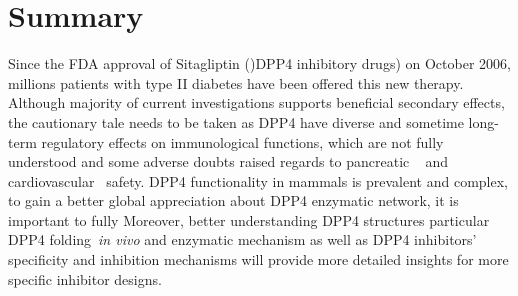 \section{\label{chap:Sum} Summary}
Since the FDA approval of Sitagliptin ()DPP4 inhibitory drugs) on October 2006, millions patients with type II diabetes have been offered this new therapy. Although majority of current investigations supports beneficial secondary effects, the cautionary tale needs to be taken as DPP4 have diverse and sometime long-term regulatory effects on immunological functions, which are not fully understood and some adverse doubts raised regards to pancreatic ~\cite{Egan2014, Jermendy2016} and cardiovascular~\cite{Scirica2013} safety. DPP4 functionality in mammals is prevalent and complex, to gain a better global appreciation about DPP4 enzymatic network, it is important to fully   Moreover, better understanding DPP4 structures particular DPP4 folding~\textit{in vivo} and enzymatic mechanism as well as DPP4 inhibitors' specificity and inhibition mechanisms will provide more detailed insights for more specific inhibitor designs. 
